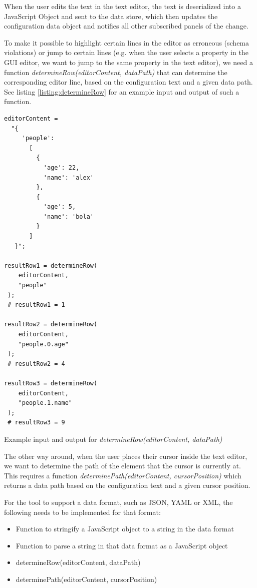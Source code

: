 When the user edits the text in the text editor, the text is deserialized into a JavaScript Object and sent to the data store, which then updates the configuration data object and notifies all other subscribed panels of the change.

To make it possible to highlight certain lines in the editor as erroneous (schema violations) or jump to certain lines (e.g. when the user selects a property in the GUI editor, we want to jump to the same property in the text editor), we need a function \textit{determineRow(editorContent, dataPath)} that can determine the corresponding editor line, based on the configuration text and a given data path. See listing \ref{listing:determineRow} for an example input and output of such a function.

\begin{listing}[!h]
    \begin{verbatim}
editorContent =
  "{
     'people':
       [
         {
           'age': 22,
           'name': 'alex'
         },
         {
           'age': 5,
           'name': 'bola'
         }
       ]
   }";

resultRow1 = determineRow(
	editorContent,
	"people"
 );
 # resultRow1 = 1

resultRow2 = determineRow(
	editorContent,
	"people.0.age"
 );
 # resultRow2 = 4

resultRow3 = determineRow(
	editorContent,
	"people.1.name"
 );
 # resultRow3 = 9

    \end{verbatim}
    \caption{Example input and output for \textit{determineRow(editorContent, dataPath)}}
    \label{listing:determineRow}
\end{listing}

The other way around, when the user places their cursor inside the text editor, we want to determine the path of the element that the cursor is currently at. This requires a function \textit{determinePath(editorContent, cursorPosition)} which returns a data path based on the configuration text and a given cursor position.

For the tool to support a data format, such as JSON, YAML or XML, the following needs to be implemented for that format:
\begin{itemize}
	\item Function to stringify a JavaScript object to a string in the data format
	\item Function to parse a string in that data format as a JavaScript object
	\item determineRow(editorContent, dataPath)
	\item determinePath(editorContent, cursorPosition)
\end{itemize}

